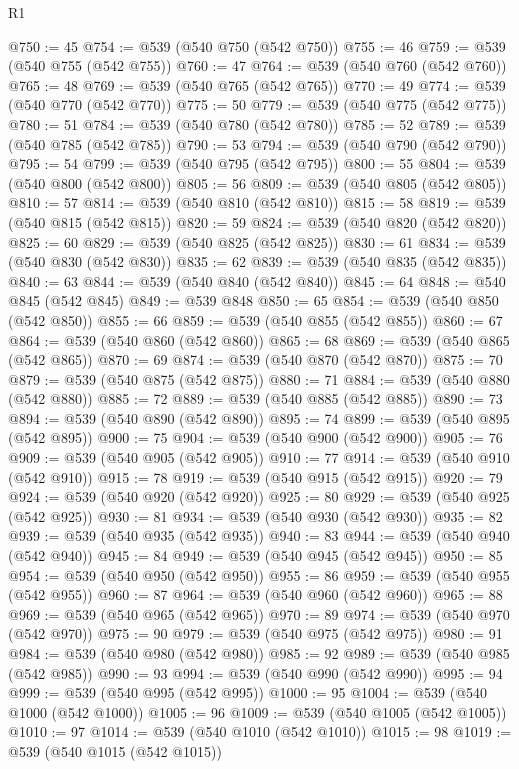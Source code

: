 \begin{lexlean}{R1}
\begin{coremodule}
{{{{{{{{{{{{{{{{{{{{{{{{{{{{{{{{{{{{{{{{@750 := 45
@754 := @539 (@540 @750 (@542 @750))
@755 := 46
@759 := @539 (@540 @755 (@542 @755))
@760 := 47
@764 := @539 (@540 @760 (@542 @760))
@765 := 48
@769 := @539 (@540 @765 (@542 @765))
@770 := 49
@774 := @539 (@540 @770 (@542 @770))
@775 := 50
@779 := @539 (@540 @775 (@542 @775))
@780 := 51
@784 := @539 (@540 @780 (@542 @780))
@785 := 52
@789 := @539 (@540 @785 (@542 @785))
@790 := 53
@794 := @539 (@540 @790 (@542 @790))
@795 := 54
@799 := @539 (@540 @795 (@542 @795))
@800 := 55
@804 := @539 (@540 @800 (@542 @800))
@805 := 56
@809 := @539 (@540 @805 (@542 @805))
@810 := 57
@814 := @539 (@540 @810 (@542 @810))
@815 := 58
@819 := @539 (@540 @815 (@542 @815))
@820 := 59
@824 := @539 (@540 @820 (@542 @820))
@825 := 60
@829 := @539 (@540 @825 (@542 @825))
@830 := 61
@834 := @539 (@540 @830 (@542 @830))
@835 := 62
@839 := @539 (@540 @835 (@542 @835))
@840 := 63
@844 := @539 (@540 @840 (@542 @840))
@845 := 64
@848 := @540 @845 (@542 @845)
@849 := @539 @848
@850 := 65
@854 := @539 (@540 @850 (@542 @850))
@855 := 66
@859 := @539 (@540 @855 (@542 @855))
@860 := 67
@864 := @539 (@540 @860 (@542 @860))
@865 := 68
@869 := @539 (@540 @865 (@542 @865))
@870 := 69
@874 := @539 (@540 @870 (@542 @870))
@875 := 70
@879 := @539 (@540 @875 (@542 @875))
@880 := 71
@884 := @539 (@540 @880 (@542 @880))
@885 := 72
@889 := @539 (@540 @885 (@542 @885))
@890 := 73
@894 := @539 (@540 @890 (@542 @890))
@895 := 74
@899 := @539 (@540 @895 (@542 @895))
@900 := 75
@904 := @539 (@540 @900 (@542 @900))
@905 := 76
@909 := @539 (@540 @905 (@542 @905))
@910 := 77
@914 := @539 (@540 @910 (@542 @910))
@915 := 78
@919 := @539 (@540 @915 (@542 @915))
@920 := 79
@924 := @539 (@540 @920 (@542 @920))
@925 := 80
@929 := @539 (@540 @925 (@542 @925))
@930 := 81
@934 := @539 (@540 @930 (@542 @930))
@935 := 82
@939 := @539 (@540 @935 (@542 @935))
@940 := 83
@944 := @539 (@540 @940 (@542 @940))
@945 := 84
@949 := @539 (@540 @945 (@542 @945))
@950 := 85
@954 := @539 (@540 @950 (@542 @950))
@955 := 86
@959 := @539 (@540 @955 (@542 @955))
@960 := 87
@964 := @539 (@540 @960 (@542 @960))
@965 := 88
@969 := @539 (@540 @965 (@542 @965))
@970 := 89
@974 := @539 (@540 @970 (@542 @970))
@975 := 90
@979 := @539 (@540 @975 (@542 @975))
@980 := 91
@984 := @539 (@540 @980 (@542 @980))
@985 := 92
@989 := @539 (@540 @985 (@542 @985))
@990 := 93
@994 := @539 (@540 @990 (@542 @990))
@995 := 94
@999 := @539 (@540 @995 (@542 @995))
@1000 := 95
@1004 := @539 (@540 @1000 (@542 @1000))
@1005 := 96
@1009 := @539 (@540 @1005 (@542 @1005))
@1010 := 97
@1014 := @539 (@540 @1010 (@542 @1010))
@1015 := 98
@1019 := @539 (@540 @1015 (@542 @1015))
}}}}}}}}}}}}}}}}}}}}}}}}}}}}}}}}}}}}}}}}
\end{coremodule}
\end{lexlean}
